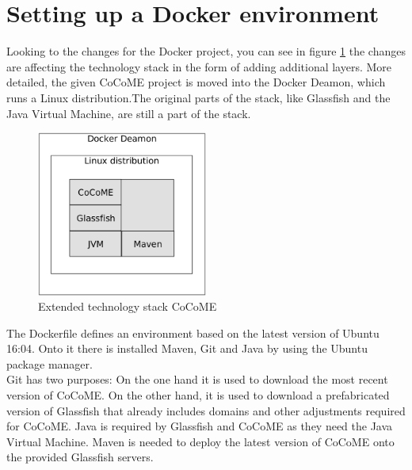 \section{Setting up a Docker environment} \label{Docker}
	Looking to the changes for the Docker project, you can see in figure \ref*{techStack} the changes are affecting the technology stack in the form of adding additional layers. More detailed, the given CoCoME project is moved into the Docker Deamon, which runs a Linux distribution.The original parts of the stack, like Glassfish and the Java Virtual Machine, are still a part of the stack.\\
	\begin{figure}[H]
		\centering
		\includegraphics[width = 0.5\textwidth]{img/tech_stack_CoCoME.png}
		\caption{Extended technology stack CoCoME}
		\label{techStack}
	\end{figure}
	
	The Dockerfile defines an environment based on the latest version of Ubuntu 16:04. Onto it there is installed Maven, Git and Java by using the Ubuntu package manager.\\
	Git has two purposes: On the one hand it is used to download the most recent version of CoCoME.	On the other hand, it is used to download a prefabricated version of Glassfish that already includes domains and other adjustments required for CoCoME. Java is required by Glassfish and CoCoME as they need the Java Virtual Machine. Maven is needed to deploy the latest version of CoCoME onto the provided Glassfish servers.
	

